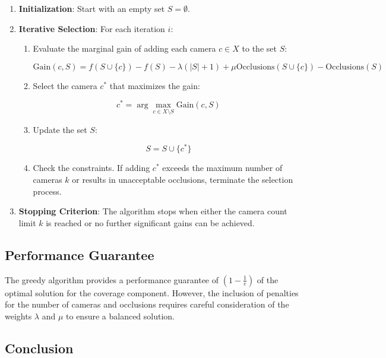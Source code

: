 \begin{enumerate}
	\item \textbf{Initialization}: Start with an empty set \( S = \emptyset \).
	
	\item \textbf{Iterative Selection}: For each iteration \( i \):
	
	\begin{enumerate}
		\item Evaluate the marginal gain of adding each camera \( c \in X \) to the set \( S \):
		
		\[
		\text{Gain}(c, S) = f(S \cup \{c\}) - f(S) - \lambda (|S| + 1) + \mu \text{Occlusions}(S \cup \{c\}) - \text{Occlusions}(S)
		\]
		
		\item Select the camera \( c^* \) that maximizes the gain:
		
		\[
		c^* = \arg\max_{c \in X \setminus S} \text{Gain}(c, S)
		\]
		
		\item Update the set \( S \):
		
		\[
		S = S \cup \{c^*\}
		\]
		
		\item Check the constraints. If adding \( c^* \) exceeds the maximum number of cameras \( k \) or results in unacceptable occlusions, terminate the selection process.
	\end{enumerate}
	
	\item \textbf{Stopping Criterion}: The algorithm stops when either the camera count limit \( k \) is reached or no further significant gains can be achieved.
\end{enumerate}

\subsection*{Performance Guarantee}

The greedy algorithm provides a performance guarantee of \( (1 - \frac{1}{e}) \) of the optimal solution for the coverage component. However, the inclusion of penalties for the number of cameras and occlusions requires careful consideration of the weights \( \lambda \) and \( \mu \) to ensure a balanced solution.

\subsection*{Conclusion}

